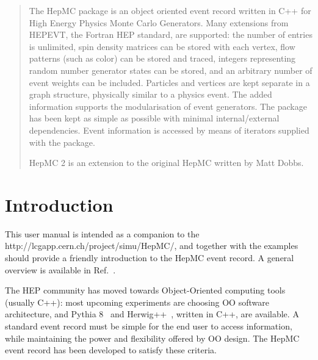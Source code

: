 \documentclass[11pt,letterpaper]{article}
\begin{document}
\begin{titlepage}
\begin{center}
\end{center}
\begin{abstract}
  The HepMC package is an object oriented event record written in C++
  for High Energy Physics Monte Carlo Generators.  Many extensions
  from HEPEVT, the Fortran HEP standard, are supported: the number of
  entries is unlimited, spin density matrices can be stored with each
  vertex, flow patterns (such as color) can be stored and traced,
  integers representing random number generator states can be stored,
  and an arbitrary number of event weights can be included.  Particles
  and vertices are kept separate in a graph structure, physically
  similar to a physics event.  The added information supports the
  modularisation of event generators.  The package has been kept as
  simple as possible with minimal internal/external dependencies.
  Event information is accessed by means of iterators supplied with
  the package. 

  HepMC 2 is an extension to the original HepMC written by Matt Dobbs.
\end{abstract}
\end{titlepage}

\setcounter{page}{1}
\tableofcontents
\listoffigures
\listoftables

\newpage

%
%

\section{Introduction}
This user manual is intended as a companion to the 
{http://lcgapp.cern.ch/project/simu/HepMC/},
and together with the examples
should provide a friendly introduction to the HepMC event record. A
general overview is available in Ref.~\cite{dobbs:2000CompPhysComm}.

The HEP community has moved towards Object-Oriented computing tools
(usually C++): most upcoming experiments are choosing OO software
architecture, and Pythia 8~\cite{Torbjorn} and 
Herwig++~\cite{Richardson}, written in C++, are available.  
A standard event record must be simple for the end user to access information,
while maintaining the power and flexibility offered by OO design. The
HepMC event record has been developed to satisfy these criteria.
\end{document}
